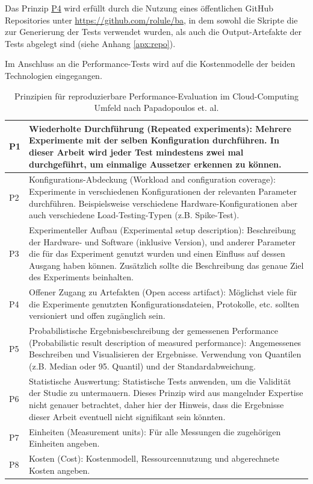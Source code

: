 Das Prinzip \hyperref[tab:research-questions]{P4} wird erfüllt durch die Nutzung eines öffentlichen GitHub Repositories unter \url{https://github.com/rolule/ba}, in dem sowohl die Skripte die zur Generierung der Tests verwendet wurden, als auch die Output-Artefakte der Tests abgelegt sind (siehe Anhang \ref{apx:repo}).

Im Anschluss an die Performance-Tests wird auf die Kostenmodelle der beiden Technologien eingegangen.

\begin{table}[H]
\begin{tabularx}{\textwidth}{|l|X|}
\hline
P1 & Wiederholte Durchführung (Repeated experiments): Mehrere Experimente mit der selben Konfiguration durchführen. In dieser Arbeit wird jeder Test mindestens zwei mal durchgeführt, um einmalige Aussetzer erkennen zu können. \\ \hline

P2 & Konfigurations-Abdeckung (Workload and configuration coverage): Experimente in verschiedenen Konfigurationen der relevanten Parameter durchführen. Beispielsweise verschiedene Hardware-Konfigurationen aber auch verschiedene Load-Testing-Typen (z.B. Spike-Test). \\ \hline

P3 & Experimenteller Aufbau (Experimental setup description): Beschreibung der Hardware- und Software (inklusive Version), und anderer Parameter die für das Experiment genutzt wurden und einen Einfluss auf dessen Ausgang haben können. Zusätzlich sollte die Beschreibung das genaue Ziel des Experiments beinhalten. \\ \hline

P4 & Offener Zugang zu Artefakten (Open access artifact): Möglichst viele für die Experimente genutzten Konfigurationsdateien, Protokolle, etc. sollten versioniert und offen zugänglich sein. \\ \hline

P5 & Probabilistische Ergebnisbeschreibung der gemessenen Performance (Probabilistic result description of measured performance): Angemessenes Beschreiben und Visualisieren der Ergebnisse. Verwendung von Quantilen (z.B. Median oder 95. Quantil) und der Standardabweichung. \\ \hline

P6 & Statistische Auswertung: Statistische Tests anwenden, um die Validität der Studie zu untermauern. Dieses Prinzip wird aus mangelnder Expertise nicht genauer betrachtet, daher hier der Hinweis, dass die Ergebnisse dieser Arbeit eventuell nicht signifikant sein könnten. \\ \hline

P7 & Einheiten (Measurement units): Für alle Messungen die zugehörigen Einheiten angeben. \\ \hline

P8 & Kosten (Cost): Kostenmodell, Ressourcennutzung und abgerechnete Kosten angeben. \\ \hline
\end{tabularx}
\caption{\label{tab:principles}Prinzipien für reproduzierbare Performance-Evaluation im Cloud-Computing Umfeld nach Papadopoulos et. al.\cite{papadopoulos_methodological_2019}}
\end{table}

